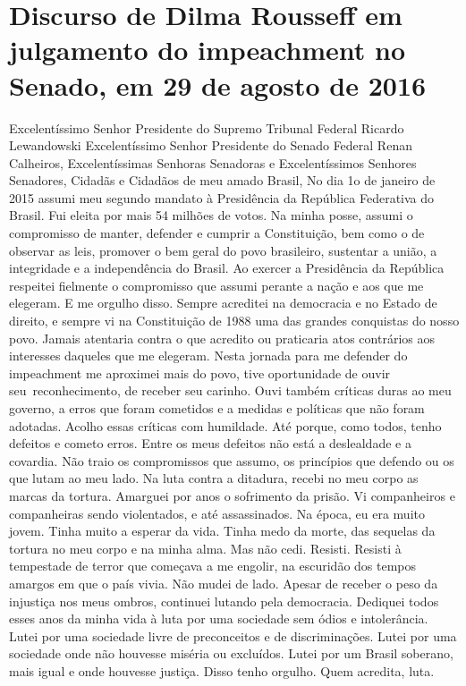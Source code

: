 \chapter*{Discurso de Dilma Rousseff em julgamento do impeachment no Senado, em 29
de agosto de 2016}


Excelentíssimo Senhor Presidente do Supremo Tribunal Federal Ricardo
Lewandowski Excelentíssimo Senhor Presidente do Senado Federal Renan
Calheiros, Excelentíssimas Senhoras Senadoras e Excelentíssimos Senhores
Senadores, Cidadãs e Cidadãos de meu amado Brasil, No dia 1o de janeiro
de 2015 assumi meu segundo mandato à Presidência da República Federativa
do Brasil. Fui eleita por mais 54 milhões de votos. Na minha posse,
assumi o compromisso de manter, defender e cumprir a Constituição, bem
como o de observar as leis, promover o bem geral do povo brasileiro,
sustentar a união, a integridade e a independência do Brasil. Ao exercer
a Presidência da República respeitei fielmente o compromisso que assumi
perante a nação e aos que me elegeram. E me orgulho disso. Sempre
acreditei na democracia e no Estado de direito, e sempre vi na
Constituição de 1988 uma das grandes conquistas do nosso povo. Jamais
atentaria contra o que acredito ou praticaria atos contrários aos
interesses daqueles que me elegeram. Nesta jornada para me defender do
impeachment me aproximei mais do povo, tive oportunidade de ouvir
seu~reconhecimento, de receber seu carinho. Ouvi também críticas duras
ao meu governo, a erros que foram cometidos e a medidas e políticas que
não foram adotadas. Acolho essas críticas com humildade. Até porque,
como todos, tenho defeitos e cometo erros. Entre os meus defeitos não
está a deslealdade e a covardia. Não traio os compromissos que assumo,
os princípios que defendo ou os que lutam ao meu lado. Na luta contra a
ditadura, recebi no meu corpo as marcas da tortura. Amarguei por anos o
sofrimento da prisão. Vi companheiros e companheiras sendo violentados,
e até assassinados. Na época, eu era muito jovem. Tinha muito a esperar
da vida. Tinha medo da morte, das sequelas da tortura no meu corpo e na
minha alma. Mas não cedi. Resisti. Resisti à tempestade de terror que
começava a me engolir, na escuridão dos tempos amargos em que o país
vivia. Não mudei de lado. Apesar de receber o peso da injustiça nos meus
ombros, continuei lutando pela democracia. Dediquei todos esses anos da
minha vida à luta por uma sociedade sem ódios e intolerância. Lutei por
uma sociedade livre de preconceitos e de discriminações. Lutei por uma
sociedade onde não houvesse miséria ou excluídos. Lutei por um Brasil
soberano, mais igual e onde houvesse justiça. Disso tenho orgulho. Quem
acredita, luta.

